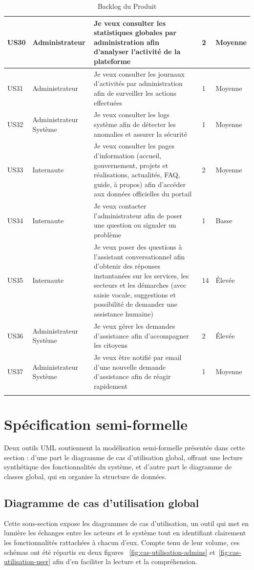 \begin{longtable}{|p{1cm}|p{3cm}|p{6.5cm}|p{1.5cm}|p{2cm}|}
US30 & Administrateur & Je veux consulter les statistiques globales par administration afin d'analyser l'activité de la plateforme & 2 & Moyenne \\ \hline
US31 & Administrateur & Je veux consulter les journaux d'activités par administration afin de surveiller les actions effectuées & 1 & Moyenne \\ \hline
US32 & Administrateur Système & Je veux consulter les logs système afin de détecter les anomalies et assurer la sécurité & 1 & Moyenne \\ \hline
US33 & Internaute & Je veux consulter les pages d'information (accueil, gouvernement, projets et réalisations, actualités, FAQ, guide, à propos) afin d'accéder aux données officielles du portail & 2 & Moyenne \\ \hline
US34 & Internaute & Je veux contacter l'administrateur afin de poser une question ou signaler un problème & 1 & Basse \\ \hline
US35 & Internaute & Je veux poser des questions à l'assistant conversationnel afin d'obtenir des réponses instantanées sur les services, les secteurs et les démarches (avec saisie vocale, suggestions et possibilité de demander une assistance humaine) & 14 & Élevée \\ \hline
US36 & Administrateur Système & Je veux gérer les demandes d'assistance afin d'accompagner les citoyens & 2 & Élevée \\ \hline
US37 & Administrateur Système & Je veux être notifié par email d'une nouvelle demande d'assistance afin de réagir rapidement & 1 & Moyenne \\ \hline

\caption{Backlog du Produit}
\label{tab:Backlogr_Produit}

\end{longtable}





\section{Spécification semi-formelle}
Deux outils UML soutiennent la modélisation semi-formelle présentée dans cette section : d'une part le diagramme de cas d'utilisation global, offrant une lecture synthétique des fonctionnalités du système, et d'autre part le diagramme de classes global, qui en organise la structure de données. 

\subsection{Diagramme de cas d'utilisation global}
Cette sous-section expose les diagrammes de cas d'utilisation, un outil qui met en lumière les échanges entre les acteurs et le système tout en identifiant clairement les fonctionnalités rattachées à chacun d'eux. Compte tenu de leur volume, ces schémas ont été répartis en deux figures ~\ref{fig:cas-utilisation-admins} et~\ref{fig:cas-utilisation-user} afin d'en faciliter la lecture et la compréhension. 




